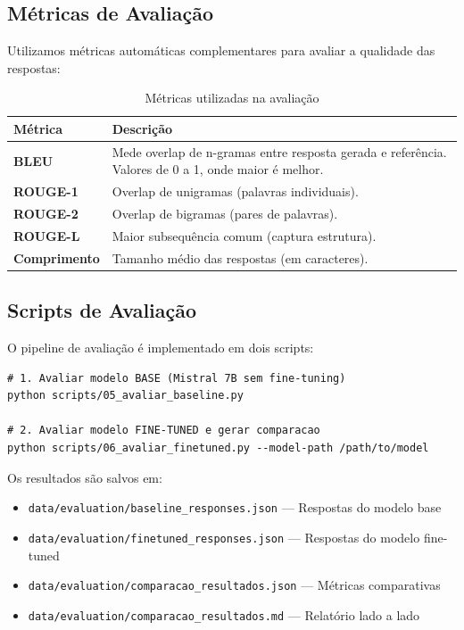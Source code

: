 \subsection{Métricas de Avaliação}

Utilizamos métricas automáticas complementares para avaliar a qualidade das respostas:

\begin{table}[H]
\centering
\caption{Métricas utilizadas na avaliação}
\label{tab:metricas}
\begin{tabular}{lp{8cm}}
\toprule
\textbf{Métrica} & \textbf{Descrição} \\
\midrule
\textbf{BLEU} & Mede overlap de n-gramas entre resposta gerada e referência. Valores de 0 a 1, onde maior é melhor. \\
\textbf{ROUGE-1} & Overlap de unigramas (palavras individuais). \\
\textbf{ROUGE-2} & Overlap de bigramas (pares de palavras). \\
\textbf{ROUGE-L} & Maior subsequência comum (captura estrutura). \\
\textbf{Comprimento} & Tamanho médio das respostas (em caracteres). \\
\bottomrule
\end{tabular}
\end{table}

\subsection{Scripts de Avaliação}

O pipeline de avaliação é implementado em dois scripts:

\begin{lstlisting}[style=bash, caption={Execução da avaliação}]
# 1. Avaliar modelo BASE (Mistral 7B sem fine-tuning)
python scripts/05_avaliar_baseline.py

# 2. Avaliar modelo FINE-TUNED e gerar comparacao
python scripts/06_avaliar_finetuned.py --model-path /path/to/model
\end{lstlisting}

Os resultados são salvos em:

\begin{itemize}
    \item \texttt{data/evaluation/baseline\_responses.json} --- Respostas do modelo base
    \item \texttt{data/evaluation/finetuned\_responses.json} --- Respostas do modelo fine-tuned
    \item \texttt{data/evaluation/comparacao\_resultados.json} --- Métricas comparativas
    \item \texttt{data/evaluation/comparacao\_resultados.md} --- Relatório lado a lado
\end{itemize}

